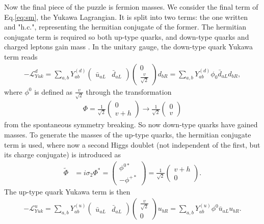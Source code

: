 \documentclass[a4paper,12pt]{article}
\begin{document}
Now the final piece of the puzzle is fermion masses. 
We consider the final term of Eq.\eqref{eq:sm}, the Yukawa Lagrangian. 
It is split into two terms: the one written and "h.c.", representing the hermitian conjugate of the former.
The hermitian conjugate term is required so both up-type quarks, and down-type quarks and charged leptons gain mass \cite{higgs}. 
In the unitary gauge, the down-type quark Yukawa term reads
\begin{align}
    \label{eq:yuk}
    -\mathcal{L}_{Yuk}^d = \sum_{a,b} Y^{(d)}_{ab} \begin{pmatrix} \bar{u}_{aL} & \bar{d}_{aL}\end{pmatrix}\begin{pmatrix}0\\\frac{v}{\sqrt{2}}\end{pmatrix}d_{bR} = \sum_{a,b}Y^{(d)}_{ab}\phi_0\bar{d}_{aL}d_{bR},
\end{align}
where $\phi^0$ is defined as $\frac{v}{\sqrt{2}}$ through the transformation
\begin{align}
    \label{eq:vtoh}
    \Phi = \frac{1}{\sqrt{2}}\begin{pmatrix}0\\v+h\end{pmatrix}\to\frac{1}{\sqrt{2}}\begin{pmatrix}0\\v\end{pmatrix}
\end{align}
from the spontaneous symmetry breaking. 
So now down-type quarks have gained masses. 
To generate the masses of the up-type quarks, the hermitian conjugate term is used, where now a second Higgs doublet (not independent of the first, but its charge conjugate) is introduced as
\begin{align}
    \label{eq:highc}
    \tilde{\Phi} &= i\sigma_2\Phi^* = \begin{pmatrix}\phi^{0*}\\-\phi^{+*}\end{pmatrix} = \frac{1}{\sqrt{2}}\begin{pmatrix}v+h\\0\end{pmatrix}.
\end{align}
The up-type quark Yukawa term is then
\begin{align}
    \label{eq:yukhc}
    -\mathcal{L}_{Yuk}^u = \sum_{a,b} Y^{(u)}_{ab}\begin{pmatrix}\bar{u}_{aL} & \bar{d}_{aL}\end{pmatrix}\begin{pmatrix}\frac{v}{\sqrt{2}}\\0\end{pmatrix}u_{bR} = \sum_{a,b}Y^{(u)}_{ab}\phi^0\bar{u}_{aL}u_{bR}.
\end{align}
\end{document}
